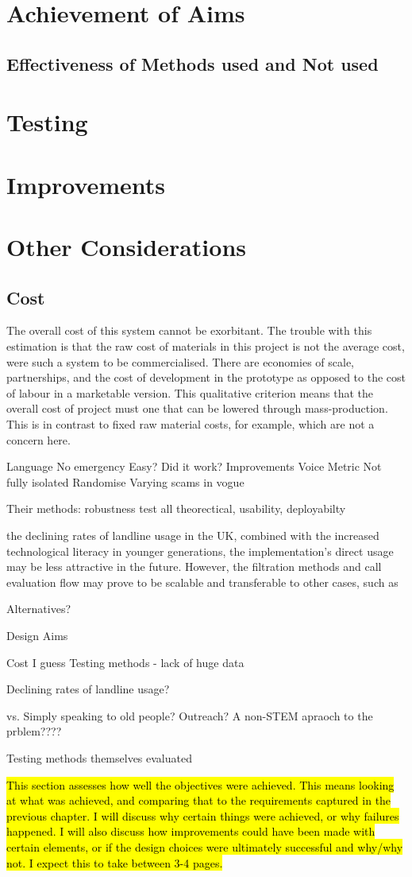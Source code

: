 \documentclass[main.tex]{subfiles}
\begin{document}
\section{Achievement of Aims}
\subsection{Effectiveness of Methods used and Not used}
\section{Testing}
\section{Improvements}
\section{Other Considerations}

\subsection{Cost}
The overall cost of this system cannot be exorbitant. The trouble with this estimation is that the raw cost of materials in this project is not the average cost, were such a system to be commercialised. There are economies of scale, partnerships, and the cost of development in the prototype as opposed to the cost of labour in a marketable version. This qualitative criterion means that the overall cost of project must one that can be lowered through mass-production. This is in contrast to fixed raw material costs, for example, which are not a concern here.

Language
No emergency
Easy?
Did it work?
Improvements
Voice Metric
Not fully isolated
Randomise
Varying scams in vogue

Their methods: robustness test all theorectical, usability, deployabilty

the declining rates of landline usage in the UK, combined with the increased technological literacy in younger generations, the implementation’s direct usage may be less attractive in the future. However, the filtration methods and call evaluation flow may prove to be scalable and transferable to other cases, such as

Alternatives?

Design Aims

Cost I guess
Testing methods - lack of huge data

Declining rates of landline usage?

vs. Simply speaking to old people? Outreach? A non-STEM apraoch to the prblem????


Testing methods themselves evaluated

\hl{This section assesses how well the objectives were achieved. This means looking at what was achieved, and comparing that to the requirements captured in the previous chapter. I will discuss why certain things were achieved, or why failures happened. I will also discuss how improvements could have been made with certain elements, or if the design choices were ultimately successful and why/why not. I expect this to take between 3-4 pages.}
\end{document}
